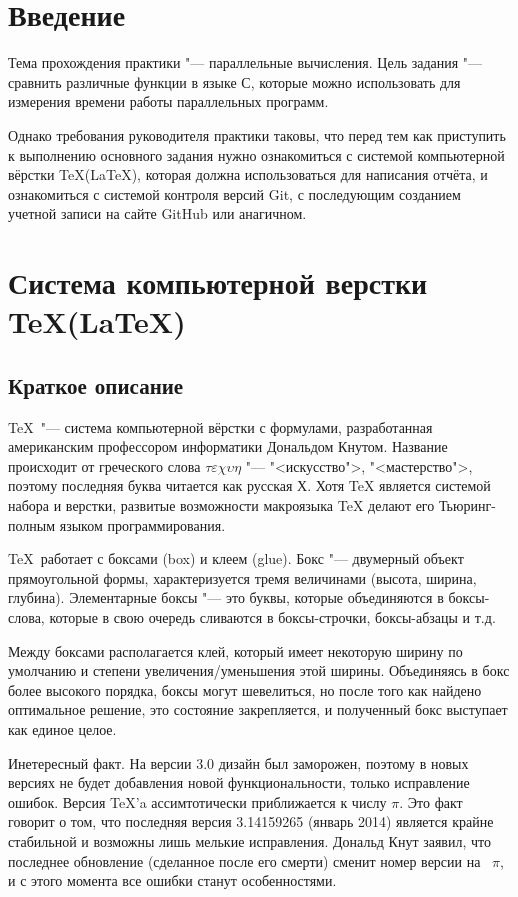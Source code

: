 \documentclass{article}
\begin{document}
	\section{Введение}
	\indent 
		Тема прохождения практики "--- параллельные вычисления. Цель задания "--- сравнить различные функции в языке С, которые 		можно использовать для измерения времени работы параллельных программ.
		
		Однако требования руководителя практики таковы, что перед тем как приступить к выполнению основного задания нужно 				ознакомиться с системой компьютерной вёрстки \TeX (\LaTeX), которая должна
	использоваться для написания отчёта, и ознакомиться с системой контроля версий Git, с последующим созданием учетной записи на 	сайте GitHub или анагичном.
	\newpage
	\section{Система компьютерной верстки \TeX(\LaTeX)}	
		\subsection{Краткое описание}
			\TeX ~"--- система компьютерной вёрстки с формулами, разработанная американским профессором информатики Дональдом 				Кнутом. Название происходит от греческого слова $\tau\varepsilon\chi\upsilon\eta$ "--- "<искусство">, "<мастерство">, 				поэтому	последняя буква читается как русская Х. Хотя TeX является системой набора и верстки, развитые возможности 					макроязыка TeX делают его Тьюринг-полным языком программирования. 
		
			\TeX ~работает с боксами (box) и клеем (glue). Бокс "--- двумерный объект прямоугольной формы, характеризуется тремя 
		величинами (высота, ширина, глубина). Элементарные боксы "--- это буквы, которые объединяются в боксы-слова, которые в 				свою очередь сливаются в боксы-строчки, боксы-абзацы и т.д.

        	Между боксами располагается клей, который имеет некоторую ширину по умолчанию и степени увеличения/уменьшения этой 				ширины. Объединяясь в бокс более высокого порядка, боксы могут шевелиться, но после того как найдено оптимальное решение, 		это состояние закрепляется, и полученный бокс выступает как единое целое.
        
       		Инетересный факт. На версии 3.0 дизайн был заморожен, поэтому в новых версиях не будет добавления новой 						функциональности, только исправление ошибок. Версия \TeX 'a ассимтотически приближается к числу $\pi$. Это факт говорит о 		том, что последняя версия	3.14159265 (январь 2014) является крайне стабильной и возможны лишь мелькие исправления. 				Дональд Кнут заявил, что последнее обновление (сделанное после его смерти) сменит номер версии на ~$\pi$, и с этого 				момента все ошибки станут особенностями.
        		
\end{document}
